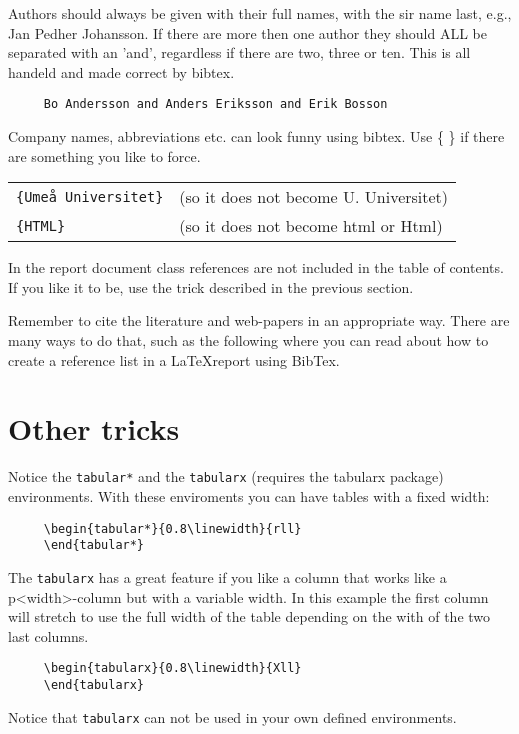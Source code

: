Authors should always be given with their full names, with the sir
name last, e.g., Jan Pedher Johansson. If there are more then one
author they should ALL be separated with an 'and', regardless if
there are two, three or ten. This is all handeld and made correct
by bibtex. 
\begin{verbatim}
     Bo Andersson and Anders Eriksson and Erik Bosson  
\end{verbatim}

Company names, abbreviations etc. can look funny using bibtex. Use 
\{ \} if there are something you like to force.

\begin{tabular}{ll}
\texttt{\{Umeå Universitet\}} & (so it does not become U. Universitet) \\
\texttt{\{HTML\}} & (so it does not become html or Html)
\end{tabular}

In the report document class references are not included in the
table of contents. If you like it to be, use the trick described in
the previous section.

Remember to cite the literature and web-papers in an appropriate way. 
There are many ways to do that, such as the following \cite{Lamp94} where 
you can read about how to create a reference list in a {\LaTeX}\-report 
using BibTex.

\section{Other tricks}

Notice the \texttt{tabular*} and the \texttt{tabularx} (requires the 
tabularx package) environments. With these enviroments you can have tables 
with a fixed width: 
\begin{verbatim}
     \begin{tabular*}{0.8\linewidth}{rll}
     \end{tabular*}
\end{verbatim}
The \texttt{tabularx} has a great feature if you like a column that works
like a p{<width>}-column but with a variable width. In this example
the first column will stretch to use the full width of the table
depending on the with of the two last columns. 
\begin{verbatim}
     \begin{tabularx}{0.8\linewidth}{Xll}
     \end{tabularx}
\end{verbatim}
Notice that \texttt{tabularx} can not be used in your own defined
environments. 


